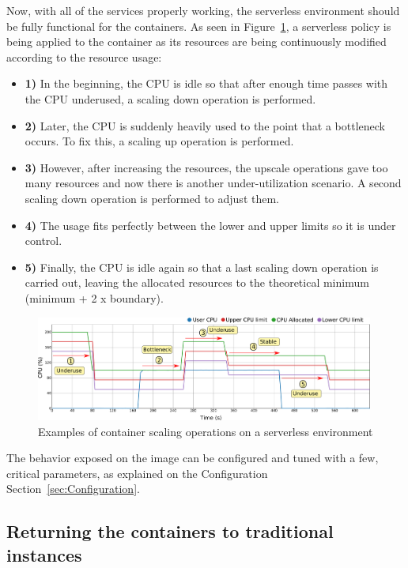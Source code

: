 \documentclass[12pt]{article}
\begin{document}
Now, with all of the services properly working, the serverless environment should be fully functional for the containers. As seen in Figure~\ref{fig:ContainerScalingExample}, a serverless policy is being applied to the container as its resources are being continuously modified according to the resource usage:
\begin{itemize}
	\item \textbf{1)} In the beginning, the CPU is idle so that after enough time passes with the CPU underused, a scaling down operation is performed.
	\item \textbf{2)} Later, the CPU is suddenly heavily used to the point that a bottleneck occurs. To fix this, a scaling up operation is performed.
	\item \textbf{3)} However, after increasing the resources, the upscale operations gave too many resources and now there is another under-utilization scenario. A second scaling down operation is performed to adjust them.
	\item \textbf{4)} The usage fits perfectly between the lower and upper limits so it is under control.
	\item \textbf{5)} Finally, the CPU is idle again so that a last scaling down operation is carried out, leaving the allocated resources to the theoretical minimum (minimum + 2 x boundary).
\end{itemize}

\begin{figure}[!tb]
	\centering
	\includegraphics[width=0.99\textwidth]{../img/quickstart/scaling_examples.png}
	\caption{Examples of container scaling operations on a serverless environment}
	\label{fig:ContainerScalingExample}
\end{figure}


The behavior exposed on the image can be configured and tuned with a few, critical parameters, as explained on the Configuration Section~\ref{sec:Configuration}.

\subsection{Returning the containers to traditional instances}
\end{document}
